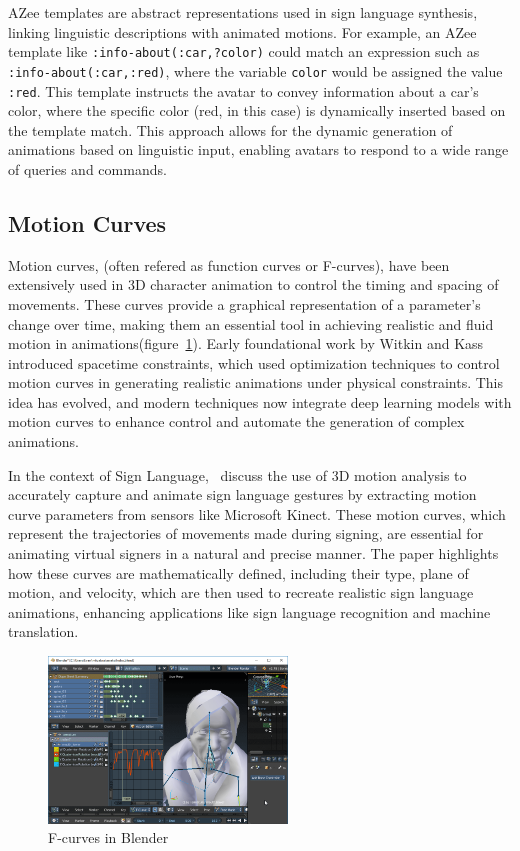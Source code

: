 \documentclass[../../main.tex]{subfiles}
\begin{document}
AZee templates are abstract representations used in sign language synthesis, linking linguistic descriptions with animated motions. For example, an AZee template like \texttt{:info-about(:car,?color)} could match an expression such as \texttt{:info-about(:car,:red)}, where the variable \texttt{color} would be assigned the value \texttt{:red}. This template instructs the avatar to convey information about a car's color, where the specific color (red, in this case) is dynamically inserted based on the template match. This approach allows for the dynamic generation of animations based on linguistic input, enabling avatars to respond to a wide range of queries and commands.

\subsection{Motion Curves}
\label{ch:intermediate_blocks:related_work:motion_curves}

Motion curves, (often refered as function curves or F-curves), have been extensively used in 3D character animation to control the timing and spacing of movements. These curves provide a graphical representation of a parameter's change over time, making them an essential tool in achieving realistic and fluid motion in animations(figure~\ref{fig:fcurves_blender}). Early foundational work by Witkin and Kass~\cite{witkin1988spacetime} introduced spacetime constraints, which used optimization techniques to control motion curves in generating realistic animations under physical constraints. This idea has evolved, and modern techniques now integrate deep learning models with motion curves to enhance control and automate the generation of complex animations.

In the context of Sign Language,~\cite{inproceedings} discuss the use of 3D motion analysis to accurately capture and animate sign language gestures by extracting motion curve parameters from sensors like Microsoft Kinect. These motion curves, which represent the trajectories of movements made during signing, are essential for animating virtual signers in a natural and precise manner. The paper highlights how these curves are mathematically defined, including their type, plane of motion, and velocity, which are then used to recreate realistic sign language animations, enhancing applications like sign language recognition and machine translation.

\begin{figure}
    \centering \includegraphics[width = 2.5in]{chapters/intermediate_blocks/images/fcurves_blender.png}
    \caption{F-curves in Blender}
    \label{fig:fcurves_blender}
\end{figure}
\end{document}
